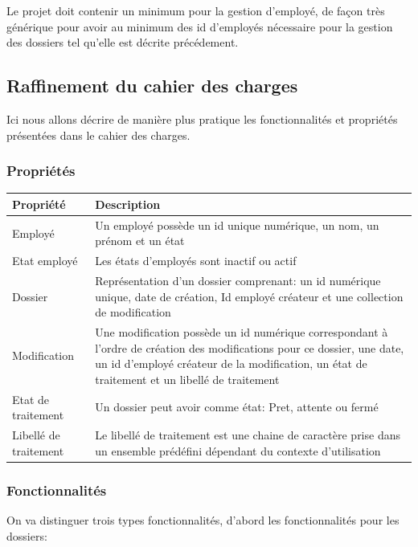 \documentclass[11pt,a4paper]{article}
\begin{document}
Le projet doit contenir un minimum pour la gestion d'employé, de façon très générique pour avoir au minimum des id d'employés nécessaire pour la gestion des dossiers tel qu'elle est décrite précédement. 


\subsection{Raffinement du cahier des charges}

Ici nous allons décrire de manière plus pratique les fonctionnalités et propriétés présentées dans le cahier des charges.

\subsubsection{Propriétés}

\begin{tabular}{|l|p{30em}|}
  \hline
  Propriété & Description \\
  \hline
  Employé & Un employé possède un id unique numérique, un nom, un prénom et un état \\
  \hline
Etat employé & Les états d'employés sont inactif ou actif  \\
  \hline
Dossier & Représentation d'un dossier comprenant: un id numérique unique, date de création, Id employé créateur et  une collection de modification  \\
  \hline
Modification & Une modification possède un id numérique correspondant à l'ordre de création des modifications pour ce dossier, une date, un id d'employé créateur de la modification, un état de traitement et un libellé de traitement  \\
  \hline

Etat de traitement & Un dossier peut avoir comme état: Pret, attente ou fermé  \\
  \hline
Libellé de traitement &  Le libellé de traitement est une chaine de caractère prise dans un ensemble prédéfini dépendant du contexte d'utilisation\\
  \hline


\end{tabular}




\subsubsection{Fonctionnalités}

On va distinguer trois types fonctionnalités, d'abord les fonctionnalités pour les dossiers:
\end{document}
